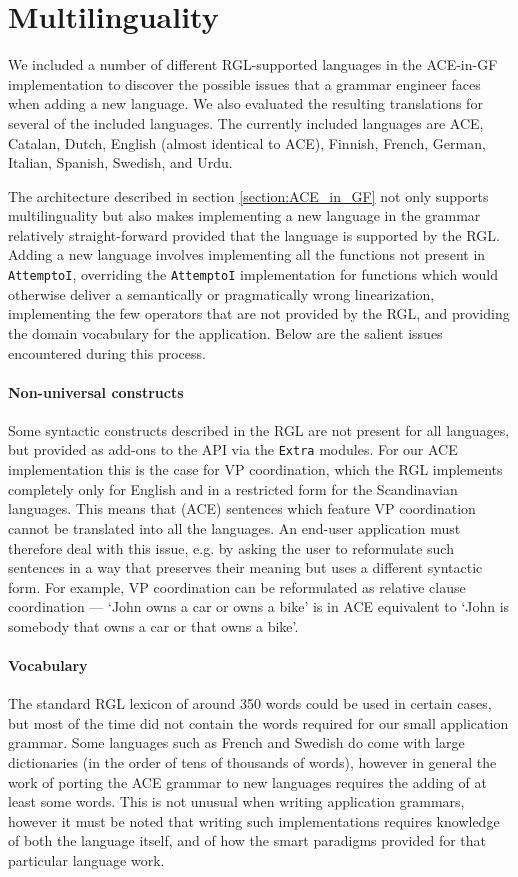 \documentclass[a4paper]{article}
\begin{document}
\section{Multilinguality}
\label{section:Multilinguality}

We included a number of different RGL-supported languages in the ACE-in-GF
implementation to discover the possible issues that a grammar engineer faces
when adding a new language. We also evaluated the resulting
translations for several of the included languages.
The currently included languages are
ACE,
Catalan,
Dutch,
English (almost identical to ACE),
Finnish,
French,
German,
Italian,
Spanish,
Swedish, and
Urdu.

The architecture described in section \ref{section:ACE_in_GF} not only
supports multilinguality but also makes implementing a new language in
the grammar relatively straight-forward provided that the language is
supported by the RGL. Adding a new language involves implementing all
the functions not present in \texttt{AttemptoI}, overriding the
\texttt{AttemptoI} implementation for functions which would otherwise
deliver a semantically or pragmatically wrong linearization,
implementing the few operators that are not provided by the RGL, and
providing the domain vocabulary for the application. Below are the
salient issues encountered during this process.

\paragraph{Non-universal constructs}
Some syntactic constructs described in the RGL are not present for all
languages, but provided as add-ons to the API via the \verb|Extra|
modules.  For our ACE implementation this is the case for VP
coordination, which the RGL implements completely only for English and
in a restricted form for the Scandinavian languages.  This means that
(ACE) sentences which feature VP coordination cannot be translated
into all the languages. An end-user application must therefore deal
with this issue, e.g. by asking the user to reformulate such sentences
in a way that preserves their meaning but uses a different syntactic
form. For example, VP coordination can be reformulated as relative
clause coordination --- `John owns a car or owns a bike' is in ACE
equivalent to `John is somebody that owns a car or that owns a bike'.

\paragraph{Vocabulary}
The standard RGL lexicon of around 350 words could be used in certain
cases, but most of the time did not contain the words required for our
small application grammar. Some languages such as French and Swedish
do come with large dictionaries (in the order of tens of thousands of
words), however in general the work of porting the ACE grammar to new
languages requires the adding of at least some words. This is not
unusual when writing application grammars, however it must be noted
that writing such implementations requires knowledge of both the
language itself, and of how the smart paradigms provided for that
particular language work.
\end{document}
